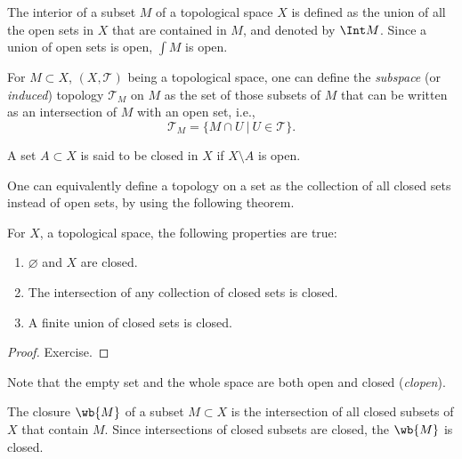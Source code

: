 \begin{defn}[Interior]
The interior of a subset $M$ of a topological space $X$ is defined as the union of all the open sets in $X$ that are contained in $M$, and denoted by $\Int M$. Since a union of open sets is open, $\int M$ is open.
\end{defn}


\begin{defn}
    For $M\subset X$, $(X,\mathcal{T})$ being a topological space, one can define the \emph{subspace} (or \emph{induced}) topology $\mathcal{T}_M$ on $M$ as the set of those subsets of $M$ that can be written as an intersection of $M$ with an open set, i.e.,
\begin{equation}
    \mathcal{T}_M = \{ M\cap U ~|~ U\in \mathcal{T} \}.
\end{equation}
\end{defn}

\begin{defn}
    A set $A\subset X$ is said to be closed in $X$ if $X\setminus A$ is open.
\end{defn}

One can equivalently define a topology on a set as the collection of all closed sets instead of open sets, by using the following theorem.

\begin{thm}
    For $X$, a topological space, the following properties are true:
\begin{enumerate}
    \item $\varnothing$ and $X$ are closed.
    \item The intersection of any collection of closed sets is closed.
    \item A finite union of closed sets is closed.
\end{enumerate}
\end{thm}
\begin{proof}
    Exercise.
\end{proof}

Note that the empty set and the whole space are both open and closed (\emph{clopen}).

\begin{defn}
    The closure $\wb{M}$ of a subset $M\subset X$ is the intersection of all closed subsets of $X$ that contain $M$. Since intersections of closed subsets are closed, the $\wb{M}$ is closed.
\end{defn}

